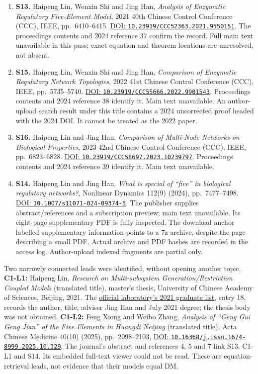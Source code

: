 \begin{enumerate}[leftmargin=*]
\item \textbf{S13.} Haipeng Lin, Wenxin Shi and Jing Han,
\emph{Analysis of Enzymatic Regulatory Five-Element Model},
2021 40th Chinese Control Conference (CCC), IEEE, pp.~6410--6415.
\href{https://doi.org/10.23919/CCC52363.2021.9550151}{DOI: \nolinkurl{10.23919/CCC52363.2021.9550151}}.
The proceedings contents and 2024 reference 37 confirm the record.
Full main text unavailable in this pass; exact equation and theorem locations
are unresolved, not absent.
\item \textbf{S15.} Haipeng Lin, Wenxin Shi and Jing Han,
\emph{Comparison of Enzymatic Regulatory Network Topologies},
2022 41st Chinese Control Conference (CCC), IEEE, pp.~5735--5740.
\href{https://doi.org/10.23919/CCC55666.2022.9901543}{DOI: \nolinkurl{10.23919/CCC55666.2022.9901543}}.
Proceedings contents and 2024 reference 38 identify it. Main text unavailable.
An author-upload search result under this title contains a 2024 uncorrected
proof headed with the 2024 DOI. It cannot be treated as the 2022 paper.
\item \textbf{S16.} Haipeng Lin and Jing Han,
\emph{Comparison of Multi-Node Networks on Biological Properties},
2023 42nd Chinese Control Conference (CCC), IEEE, pp.~6823--6828.
\href{https://doi.org/10.23919/CCC58697.2023.10239797}{DOI: \nolinkurl{10.23919/CCC58697.2023.10239797}}.
Proceedings contents and 2024 reference 39 identify it. Main text unavailable.
\item \textbf{S14.} Haipeng Lin and Jing Han,
\emph{What is special of ``five'' in biological regulatory networks?},
Nonlinear Dynamics 112(9) (2024), pp.~7477--7498.
\href{https://doi.org/10.1007/s11071-024-09374-5}{DOI: \nolinkurl{10.1007/s11071-024-09374-5}}.
The publisher supplies abstract/references and a subscription preview;
main text unavailable. Its eight-page supplementary PDF is fully inspected.
The download anchor labelled supplementary information points to a 7z archive,
despite the page describing a small PDF. Actual archive and PDF hashes are
recorded in the access log. Author-upload indexed fragments are partial only.
\end{enumerate}

Two narrowly connected leads were identified, without opening another topic.
\textbf{C1-L1:} Haipeng Lin, \emph{Research on Multi-subsystem
Generation/Restriction Coupled Models} (translated title), master's thesis,
University of Chinese Academy of Sciences, Beijing, 2021. The
\href{https://lsc.amss.cas.cn/rcpy/bfbys/202601/t20260122_821421.html}{official laboratory's 2021 graduate list},
entry 18, records the author, title, adviser Jing Han and July 2021 degree;
the thesis body was not obtained. \textbf{C1-L2:} Feng Xiong and Weibo Zhang,
\emph{Analysis of ``Geng Gui Geng Jian'' of the Five Elements in Huangdi
Neijing} (translated title), Acta Chinese Medicine 40(10) (2025),
pp.~2098--2103,
\href{https://doi.org/10.16368/j.issn.1674-8999.2025.10.329}{DOI: \nolinkurl{10.16368/j.issn.1674-8999.2025.10.329}}.
The journal's abstract and references 4, 5 and 7 link S13, C1-L1 and S14.
Its embedded full-text viewer could not be read. These are equation-retrieval
leads, not evidence that their models equal DM.

